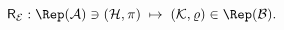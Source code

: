 \begin{equation}
        \label{eq:rieffelind}
        \mathsf{R}_{\mathcal{E}}: 
        \Rep(\mathcal{A}) \ni (\mathcal{H}, \pi) 
        \; \mapsto \;
        (\mathcal{K}, \varrho) \in \Rep(\mathcal{B}).
    \end{equation} 
